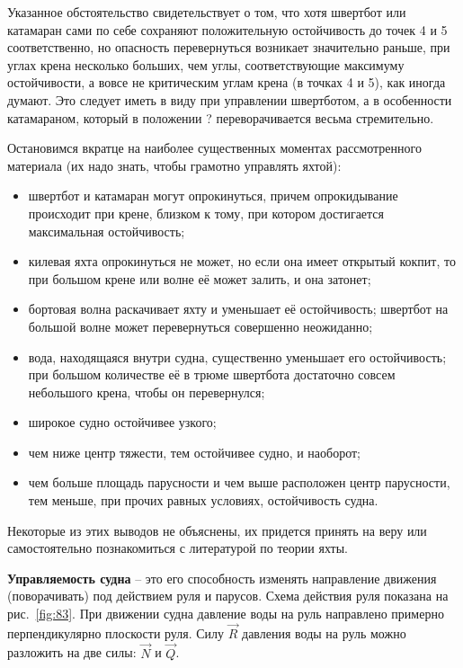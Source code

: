 \documentclass[a4paper, 12pt, twoside, final]{scrbook}
\begin{document}
Указанное обстоятельство свидетельствует о том, что хотя швертбот или катамаран сами по себе сохраняют положительную остойчивость до точек 4 и 5 соответственно, но опасность перевернуться возникает значительно раньше, при углах крена несколько больших, чем углы, соответствующие максимуму остойчивости, а вовсе не критическим углам крена (в точках 4 и 5), как иногда думают. Это следует иметь в виду при управлении швертботом, а в особенности катамараном, который в положении ? переворачивается весьма стремительно.

Остановимся вкратце на наиболее существенных моментах рассмотренного материала (их надо знать, чтобы грамотно управлять яхтой):

\begin{itemize}
\item швертбот и катамаран могут опрокинуться, причем опрокидывание происходит при крене, близком к тому, при котором достигается максимальная остойчивость;
\item килевая яхта опрокинуться не может, но если она имеет открытый кокпит, то при большом крене или волне её может залить, и она затонет;
\item бортовая волна раскачивает яхту и уменьшает её остойчивость; швертбот на большой волне может перевернуться совершенно неожиданно;
\item вода, находящаяся внутри судна, существенно уменьшает его остойчивость; при большом количестве её в трюме швертбота достаточно совсем небольшого крена, чтобы он перевернулся;
\item широкое судно остойчивее узкого;
\item чем ниже центр тяжести, тем остойчивее судно, и наоборот;
\item чем больше площадь парусности и чем выше расположен центр парусности, тем меньше, при прочих равных условиях, остойчивость судна.
\end{itemize}

Некоторые из этих выводов не объяснены, их придется принять на веру или самостоятельно познакомиться с литературой по теории яхты.

\textbf{Управляемость судна} \--- это его способность изменять направление движения (поворачивать) под действием руля и парусов. Схема действия руля показана на рис.~\ref{fig:83}. При движении судна давление воды на руль направлено примерно перпендикулярно плоскости руля. Силу $\overrightarrow{R}$ давления воды на руль можно разложить на две силы: $\overrightarrow{N}$ и $\overrightarrow{Q}$.
\end{document}
